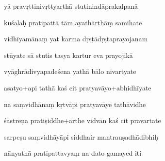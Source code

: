 \documentclass[article,12pt,a4paper]{memoir}%
\newcounter{parCount}
\begin{document}
	  
	  \pstart {} yā pravṛttinivṛttyarthā stutinindāprakalpanā 
	{}
	\pend%
      

	  
	  \pstart \leavevmode%
	kuśalaḥ pratipattā tām ayathārthāṃ samīhate 
	{}
	\pend%
      

	  
	  \pstart {} vidhīyamānaṃ yat karma dṛṣṭādṛṣṭaprayojanam 
	{}
	\pend%
      

	  
	  \pstart \leavevmode%
	stūyate sā stutis tasya kartur eva prayojikā 
	{}
	\pend%
      

	  
	  \pstart {} vyāghrādivyapadeśena yathā bālo nivartyate 
	{}
	\pend%
      

	  
	  \pstart \leavevmode%
	asatyo+api tathā kaś cit pratyavāyo+abhidhīyate 
	{}
	\pend%
      

	  
	  \pstart {} na saṃvidhānaṃ kṛtvāpi pratyavāye tathāvidhe 
	{}
	\pend%
      

	  
	  \pstart \leavevmode%
	śāstreṇa pratiṣiddhe+arthe vidvān kaś cit pravartate 
	{}
	\pend%
      

	  
	  \pstart {} sarpeṣu saṃvidhāyāpi siddhair mantrauṣadhādibhiḥ 
	{}
	\pend%
      

	  
	  \pstart \leavevmode%
	nānyathā pratipattavyaṃ na dato gamayed iti 
	{}
	\pend%
      
\end{document}

